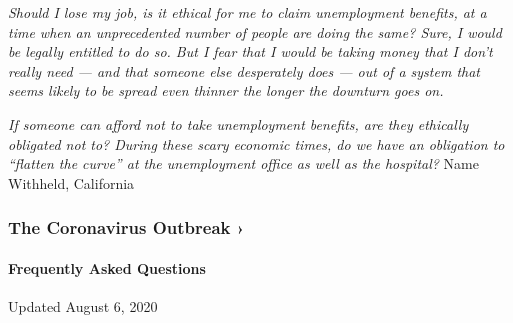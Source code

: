 \emph{Should I lose my job, is it ethical for me to claim unemployment
benefits, at a time when an unprecedented number of people are doing the
same? Sure, I would be legally entitled to do so. But I fear that I
would be taking money that I don't really need --- and that someone else
desperately does --- out of a system that seems likely to be spread even
thinner the longer the downturn goes on.}

\emph{If someone can afford not to take unemployment benefits, are they
ethically obligated not to? During these scary economic times, do we
have an obligation to ``flatten the curve'' at the unemployment office
as well as the hospital?} Name Withheld, California

\href{https://www.nytimes.com/news-event/coronavirus?action=click\&pgtype=Article\&state=default\&region=MAIN_CONTENT_3\&context=storylines_faq}{}

\hypertarget{the-coronavirus-outbreak-}{%
\subsubsection{The Coronavirus Outbreak
›}\label{the-coronavirus-outbreak-}}

\hypertarget{frequently-asked-questions}{%
\paragraph{Frequently Asked
Questions}\label{frequently-asked-questions}}

Updated August 6, 2020

